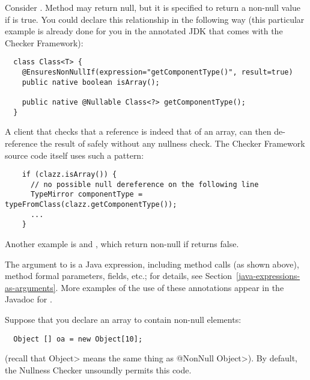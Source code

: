 Consider .
Method
may return null, but it is specified to return a non-null value if
 is
true.
You could declare this relationship in the following way (this particular
example is already
done for you in the annotated JDK that comes with the Checker Framework):

\begin{Verbatim}
  class Class<T> {
    @EnsuresNonNullIf(expression="getComponentType()", result=true)
    public native boolean isArray();

    public native @Nullable Class<?> getComponentType();
  }
\end{Verbatim}

A client that checks that a  reference is indeed that of an array,
can then de-reference the result of  safely
without any nullness check.  The Checker Framework source code itself
uses such a pattern:

\begin{Verbatim}
    if (clazz.isArray()) {
      // no possible null dereference on the following line
      TypeMirror componentType = typeFromClass(clazz.getComponentType());
      ...
    }
\end{Verbatim}

Another example is 
and , which return
non-null if 
returns false.

The argument to  is a Java expression, including method calls
(as shown above), method formal parameters, fields, etc.; for details, see
Section~\ref{java-expressions-as-arguments}.
More examples of the use of these annotations appear in the Javadoc for
.



Suppose that you declare an array to contain non-null elements:

\begin{Verbatim}
  Object [] oa = new Object[10];
\end{Verbatim}

\noindent
(recall that \<Object> means the same thing as \<@NonNull Object>).
By default, the Nullness Checker unsoundly permits this code.

